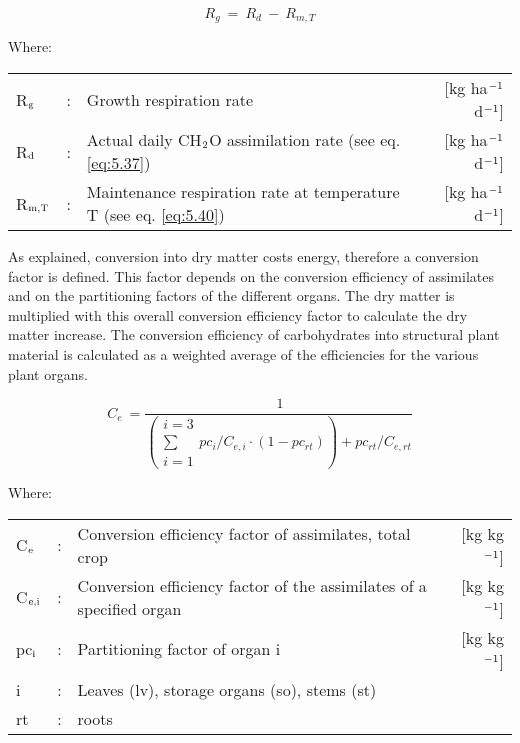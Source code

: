 \begin{equation}
\label{eq:5.41}
R _{g} ~=~ R _{d} ~-~ R _{m,T} 
\end{equation}

Where:\\[5pt]
\begin{tabularx}{\textwidth}{llXr}
	R$_{{\rm g}}$ &:& Growth respiration rate   &     [kg ha$^{{\rm -1}}$ d$^{{\rm -1}}$]\\
	R$_{{\rm d}}$ &:& Actual daily CH$_{{\rm 2}}$O assimilation rate (see eq. \ref{eq:5.37})   &   
	[kg ha$^{{\rm -1}}$ d$^{{\rm -1}}$]\\
	R$_{{\rm m,T}}$ &:& Maintenance respiration rate at 
	temperature T (see eq. \ref{eq:5.40})   &     [kg ha$^{{\rm -1}}$ d$^{{\rm -1}}$]\\
\end{tabularx}

As explained, conversion into dry matter costs energy, therefore a conversion factor is
defined. This factor depends on the conversion efficiency of assimilates and on the
partitioning factors of the different organs. The dry matter is multiplied with this overall
conversion efficiency factor to calculate the dry matter increase. The conversion 
efficiency of carbohydrates into structural plant material is calculated as a weighted average
of the efficiencies for the various plant organs.

\begin{equation}
\label{eq:5.42}
C _{e} ~={\frac{~1}{
			\left(
			\begin{array}{c}
			{i=3}  \\
			\sum  \\
			{i=1}
			\end{array} {pc_{i}}/{C_{e,i}} \cdot (1-pc_{rt}) 
			\right)
			+ {pc_{rt}}/{C_{e,rt}} 
}}
\end{equation}

Where:\\[5pt]
\begin{tabularx}{\textwidth}{llXr}
	C$_{{\rm e}}$ &:& Conversion efficiency factor of assimilates, total crop  &   
	[kg kg$^{{\rm -1}}$]\\
	C$_{{\rm e,i}}$ &:& Conversion efficiency factor of the assimilates 
	of a specified organ  &      [kg kg$^{{\rm -1}}$]\\
	pc$_{{\rm i}}$ &:& Partitioning factor of organ i   &
	[kg kg$^{{\rm -1}}$]\\
	i &:& Leaves (lv), storage organs (so), stems (st)\\
	rt &:& roots\\
\end{tabularx}

